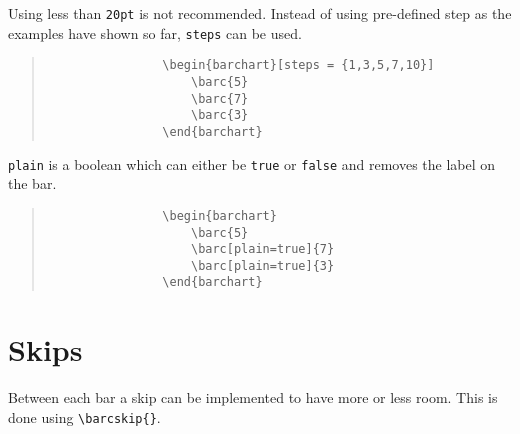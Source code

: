 \documentclass[]{article}
\begin{document}
Using less than \texttt{20pt} is not recommended. Instead of using pre-defined step as the examples have shown so far, \texttt{steps} can be used.

\begin{center}
	\begin{minipage}[l][][c]{0.45\linewidth} 	
		\begin{quote}\small
			\begin{verbatim}
				\begin{barchart}[steps = {1,3,5,7,10}]
				    \barc{5}
				    \barc{7}
				    \barc{3}
				\end{barchart}
			\end{verbatim}
		\end{quote}
		\end{minipage}
		\quad
		\begin{minipage}[r][][c]{0.45\linewidth}
		\begin{barchart}[steps = {1,3,5,7,10}]
		\end{barchart}
	\end{minipage}
\end{center}

\texttt{plain} is a boolean which can either be \texttt{true} or \texttt{false} and removes the label on the bar.

\begin{center}
	\begin{minipage}[l][][c]{0.45\linewidth} 
		\begin{quote}\small
			\begin{verbatim}
				\begin{barchart}
				    \barc{5}
				    \barc[plain=true]{7}
				    \barc[plain=true]{3}
				\end{barchart}
			\end{verbatim}
		\end{quote}
	\end{minipage}
	\quad
	\begin{minipage}[r][][c]{0.45\linewidth}	
		\begin{barchart}
		\end{barchart}
	\end{minipage}
\end{center}




\section{Skips}
Between each bar a skip can be implemented to have more or less room. This is done using \texttt{\textbackslash barcskip\{\}}. 
\end{document}

